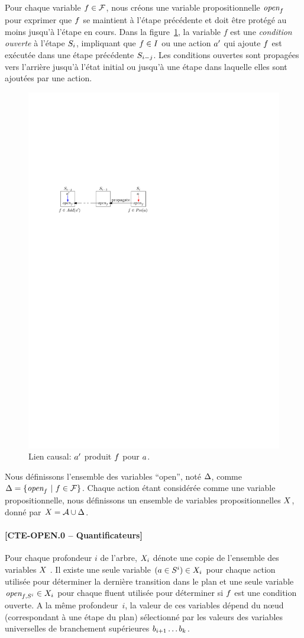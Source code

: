 Pour chaque variable $\f\in\F$, nous créons une variable propositionnelle $\openSingle{\f}$ pour exprimer que $\f$ se maintient à l'étape précédente et doit être protégé au moins jusqu'à l'étape en cours.
Dans la figure~\ref{fig:causal-link-cte}, la variable $f$ est une \textit {condition ouverte} à l'étape $\S_i$, impliquant que $\f\in\I$ ou une action $\b$ qui ajoute $\f$
est exécutée dans une étape précédente $\S_{i-j}$.
Les conditions ouvertes sont propagées vers l'arrière jusqu'à l'état initial ou jusqu'à une étape dans laquelle elles sont ajoutées par une action.


\begin{figure}[hb!]\centering
	\includegraphics[width=.5\textwidth]{figures/transitions}
    \caption{Lien causal: $\b$ produit $\f$ pour $\a$.}
    \label{fig:causal-link-cte}
\end{figure}

Nous définissons l'ensemble des variables \enquote{open}, noté $\openSet$, comme $\openSet = \{\openSingle{\f} ~|~ \f \in \F \}$. Chaque action étant considérée comme une variable propositionnelle, nous définissons un ensemble de variables propositionnelles $\X$, donné par $\X = \A \cup \openSet$.


\paragraph*{[CTE-OPEN.0 -- Quantificateurs]}

Pour chaque profondeur $i$ de l'arbre, $\X_i$ dénote une copie de l'ensemble des variables $\X$ . Il existe une seule variable $\instepcte{\a}{i}\in X_{i}$ pour chaque action utilisée pour déterminer la dernière transition dans le plan et une seule variable $\openstepcte{\f}{i}\in X_{i}$ pour chaque fluent utilisée pour déterminer si $\f$ est une condition ouverte. A la même profondeur~$i$, la valeur de ces variables dépend du n\oe ud (correspondant à une étape du plan) sélectionné par les valeurs des variables universelles de branchement supérieures $b_{i+1}\ldots b_{\depth}$.

